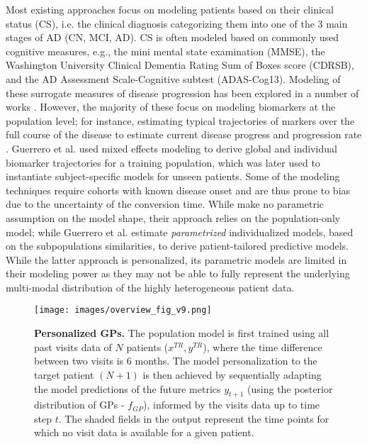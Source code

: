 \documentclass{article}
\begin{document}
Most existing approaches focus on modeling patients based on their clinical status (CS), i.e. the clinical diagnosis categorizing them into one of the 3 main stages of AD (CN, MCI, AD). CS is often modeled based on commonly used cognitive measures, e.g., the mini mental state examination (MMSE)\citep{folstein1975}, the Washington University Clinical Dementia Rating Sum of Boxes score (CDRSB)\citep{hughes1982}, and the AD Assessment Scale-Cognitive subtest (ADAS-Cog13)\citep{rosen1984}. Modeling of these surrogate measures of disease progression has been explored in a number of works 
\citep{delor13,jedynak12,schmidt_richberg15_a,schmidt-richberg16,guerrero2016,ito14,donohue14,gavidia2017,zhu2016,Doyle2014}. However, the majority of these focus on modeling biomarkers at the population level; for instance, estimating typical trajectories of markers over the full course of the disease to estimate current disease progress and progression rate \cite{schmidt_richberg15_a,schmidt-richberg16}. Guerrero et al. \cite{guerrero2016} used mixed effects modeling to derive global and individual biomarker trajectories for a training population, which was later used to instantiate subject-specific models for unseen patients. Some of the modeling techniques \cite{guerrero2016,schmidt_richberg15_a,schmidt-richberg16} require cohorts with known disease onset and are thus prone to bias due to the uncertainty of the conversion time.
While \citet{schmidt_richberg15_a,schmidt-richberg16} make no parametric assumption on the model shape, their approach relies on the population-only model; while  Guerrero et al. \cite{guerrero2016} estimate {\it parametrized} individualized models, based on the subpopulations similarities, to derive patient-tailored predictive models. While the latter approach is personalized, its parametric models are limited in their modeling power as they may not be able to fully represent the underlying multi-modal distribution of the highly heterogeneous patient data. 

\begin{figure}[t]
\centering
\texttt{[image: images/overview\_fig\_v9.png]}
\caption{{\small {\bf Personalized GPs.} The population model is first trained using all past visits data of $N$ patients ($x^{TR},y^{TR}$), where the time difference between two visits is 6 months. The model personalization to the target patient $(N+1)$ is then achieved by sequentially adapting the model predictions of the future metrics $y_{t+1}$ (using the posterior distribution of GPs - $f_{GP}$), informed by the visits data up to time step $t$. The shaded fields in the output represent the time points for which no visit data is available for a given patient.}}
\label{overview}
\end{figure}
\end{document}
